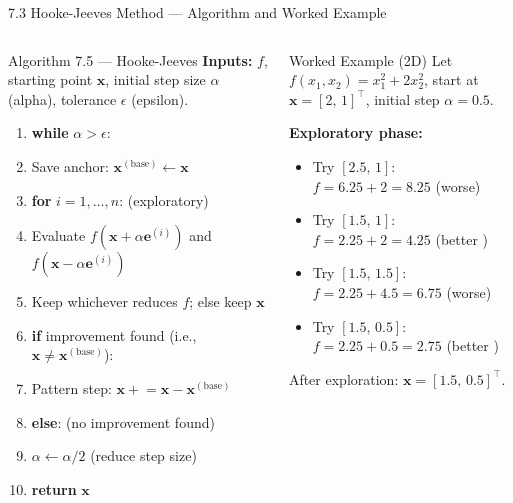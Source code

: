 \documentclass[aspectratio=169,10pt]{beamer}
\begin{document}
\begin{frame}[allowframebreaks]{7.3 Hooke-Jeeves Method --- Algorithm and Worked Example}
  \begin{columns}[T]
      \begin{alertblock}{Algorithm 7.5 --- Hooke-Jeeves}
        \textbf{Inputs:} $f$, starting point $\mathbf{x}$,
        initial step size $\alpha$ (alpha), tolerance $\epsilon$ (epsilon).
        \begin{enumerate}\setlength\itemsep{1pt}
          \item \textbf{while} $\alpha > \epsilon$:
          \item \quad Save anchor: $\mathbf{x}^{(\text{base})} \leftarrow \mathbf{x}$
          \item \quad \textbf{for} $i = 1,\ldots,n$: \hfill (exploratory)
          \item \qquad Evaluate $f(\mathbf{x} + \alpha\mathbf{e}^{(i)})$
                and $f(\mathbf{x} - \alpha\mathbf{e}^{(i)})$
          \item \qquad Keep whichever reduces $f$; else keep $\mathbf{x}$
          \item \quad \textbf{if} improvement found (i.e., $\mathbf{x} \ne \mathbf{x}^{(\text{base})}$):
          \item \qquad Pattern step:
                $\mathbf{x} \mathrel{+}= \mathbf{x} - \mathbf{x}^{(\text{base})}$
          \item \quad \textbf{else}: \hfill (no improvement found)
          \item \qquad $\alpha \leftarrow \alpha / 2$ \hfill (reduce step size)
          \item \textbf{return} $\mathbf{x}$
        \end{enumerate}
      \end{alertblock}
      \begin{exampleblock}{Worked Example (2D)}
        Let $f(x_1,x_2) = x_1^2 + 2x_2^2$, start at
        $\mathbf{x}=[2,\,1]^\top$, initial step $\alpha = 0.5$.

        \textbf{Exploratory phase:}
        \begin{itemize}\setlength\itemsep{1pt}
          \item Try $[2.5,\,1]$: $f = 6.25 + 2 = 8.25$ (worse)
          \item Try $[1.5,\,1]$: $f = 2.25 + 2 = 4.25$ (better \checkmark)
          \item Try $[1.5,\,1.5]$: $f = 2.25 + 4.5 = 6.75$ (worse)
          \item Try $[1.5,\,0.5]$: $f = 2.25 + 0.5 = 2.75$ (better \checkmark)
        \end{itemize}
        After exploration: $\mathbf{x} = [1.5,\,0.5]^\top$.


\end{exampleblock}
\end{columns}
\end{frame}
\end{document}

